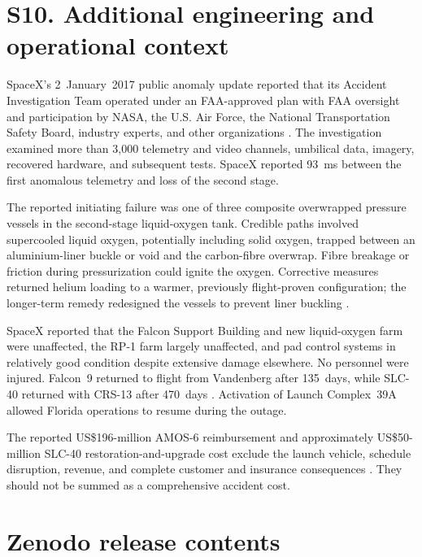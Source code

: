 \documentclass[]{seismica}
\begin{document}
\FloatBarrier


\section*{S10. Additional engineering and operational context}
\label{sec:supp_engineering}

SpaceX's 2~January~2017 public anomaly update reported that its Accident
Investigation Team operated under an FAA-approved plan with FAA oversight and
participation by NASA, the U.S. Air Force, the National Transportation Safety
Board, industry experts, and other organizations
\citep{spacex_anomaly_2017,nasa_sma_falcon9}. The investigation examined more
than 3,000 telemetry and video channels, umbilical data, imagery, recovered
hardware, and subsequent tests. SpaceX reported 93~ms between the first
anomalous telemetry and loss of the second stage.

The reported initiating failure was one of three composite overwrapped pressure
vessels in the second-stage liquid-oxygen tank. Credible paths involved
supercooled liquid oxygen, potentially including solid oxygen, trapped between
an aluminium-liner buckle or void and the carbon-fibre overwrap. Fibre breakage
or friction during pressurization could ignite the oxygen. Corrective measures
returned helium loading to a warmer, previously flight-proven configuration;
the longer-term remedy redesigned the vessels to prevent liner buckling
\citep{spacex_anomaly_2017}.

SpaceX reported that the Falcon Support Building and new liquid-oxygen farm
were unaffected, the RP-1 farm largely unaffected, and pad control systems in
relatively good condition despite extensive damage elsewhere. No personnel
were injured. Falcon~9 returned to flight from Vandenberg after 135~days, while
SLC-40 returned with CRS-13 after 470~days
\citep{spacex_iridium1_2017,spacex_crs13_2017}. Activation of Launch
Complex~39A allowed Florida operations to resume during the outage.

The reported US\$196-million AMOS-6 reimbursement and approximately
US\$50-million SLC-40 restoration-and-upgrade cost exclude the launch vehicle,
schedule disruption, revenue, and complete customer and insurance consequences
\citep{magan_amos6_2016,clark_slc40_2017}. They should not be summed as a
comprehensive accident cost.


\section*{Zenodo release contents}
\end{document}
